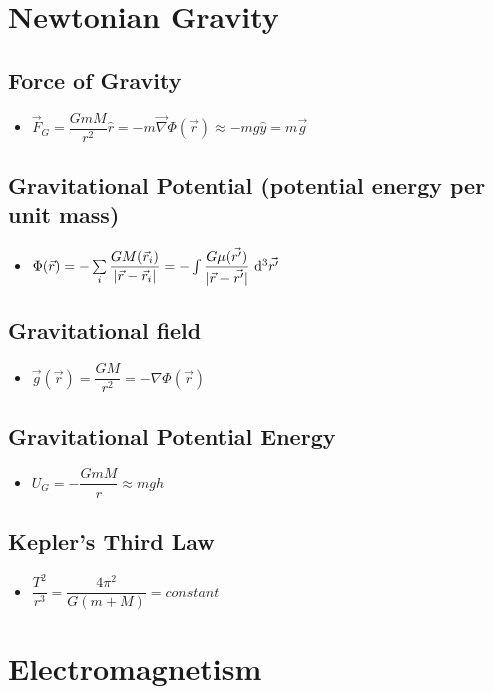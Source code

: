 \documentclass[]{report}
\newcommand \tab[1][1cm]{\hspace*{#1}}
\newcommand{\dn}[1]{\ \mathrm{d}#1}
\newcommand{\itemt}{\item \tab}
\begin{document}
	\section{Newtonian Gravity}	

\subsection{Force of Gravity}
\begin{itemize}
\itemt \( \vec{F}_G = \dfrac{GmM}{r^2} \hat{r} = -m\vec{\nabla}\Phi(\vec{r}) \approx -mg\hat{y} = m\vec{g}\)
\end{itemize}	

\subsection{Gravitational Potential (potential energy per unit mass)}		
\begin{itemize}
\itemt \( \Phi(\vec{r}) = -\sum\limits_{i} \dfrac{GM(\vec{r}_i)}{|\vec{r}-\vec{r}_i|} = - \int \dfrac{G\mu(\vec{r'})}{|\vec{r} - \vec{r'}|} \dn^3\vec{r'} \)
\end{itemize}

\subsection{Gravitational field}
\begin{itemize}
\itemt \(\vec{g}(\vec{r}) = \dfrac{GM}{r^2} = -\nabla\Phi(\vec{r})\)
\end{itemize}										

\subsection{Gravitational Potential Energy}		
\begin{itemize}
\itemt \( U_G = -\dfrac{GmM}{r} \approx mgh\)
\end{itemize}

\subsection{Kepler's Third Law}		
\begin{itemize}
\itemt \( \dfrac{T^2}{r^3} = \dfrac{4\pi^2}{G(m+M)} = constant\)
\end{itemize}	

	\section{Electromagnetism}
\end{document}
